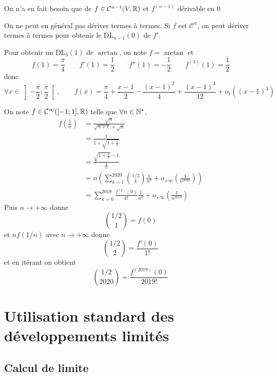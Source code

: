 \begin{rem}
    On n'a en fait besoin que de $f\in\mathcal C^{n-1}(V, \mathbb R)$ et $f^{(n-1)}$ dérivable en $0$
\end{rem}

\begin{rem}
    On ne peut en général pas dériver termes à termes. Si $f$ est $\mathcal C^n$, on peut dériver termes à termes pour obtenir le $\mathrm{DL}_{n-1}(0)$ de $f'$.
\end{rem}

\begin{ex}[$a$]
    Pour obtenir un $\mathrm{DL}_3(1)$ de $\arctan$, on note $f=\arctan$ et \[
        f(1)=\frac\pi4\qquad f'(1)=\frac12\qquad f''(1)=-\frac12\qquad f^{(3)}(1)=\frac1{2}
    \]
    donc \[
        \forall x\in \left]-\frac\pi2;\frac\pi2  \right[, \qquad f(x)=\frac\pi4+\frac{x-1}2-\frac{(x-1)^2}4+\frac{(x-1)^3}{12}+o_1((x-1)^3)
    \]
\end{ex}

\begin{ex}[$b$]
    On note $f\in\mathcal C^{\infty}([-1; 1], \mathbb R)$ telle que $\forall n\in\mathbb N^\star$, \begin{align*}
        f \left( \frac1n \right) &= \frac{\sqrt n}{\sqrt{n+1}+\sqrt n}\\
                                 &= \frac1{1+\sqrt{1+\frac1n}}\\
                                 &= \frac{\sqrt{1+\frac1n}-1}{\frac 1n}\\
                                 &= n \left( \sum_{k=1}^{2020}\binom {1/2}{k}\frac1{n^k}+o_{+\infty}(\frac{1}{n^{2020}}) \right) \\
                                 &= \sum_{k=0}^{2019}\frac{f^{(k)}(0)}{k!}\frac1{n^k}+o_{+\infty}(\frac1{n^{2019}})
    \end{align*}
    Puis $n\to +\infty$ donne \[
        \binom{1/2}1=f(0)
    \]
    et $nf(1/n)$ avec $n\to+\infty$ donne \[
        \binom{1/2}2=\frac{f'(0)}{1!}
    \]
    et en itérant on obtient \[
        \binom{1/2}{2020}=\frac{f^{(2019)}(0)}{2019!}
    \]
\end{ex}

\section{Utilisation standard des développements limités}

\subsection{Calcul de limite}

